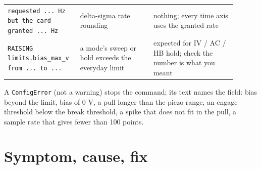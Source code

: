 \begin{longtable}{@{}>{\raggedright\arraybackslash}p{0.26\linewidth}>{\raggedright\arraybackslash}p{0.30\linewidth}>{\raggedright\arraybackslash}p{0.34\linewidth}@{}}
\texttt{requested .\discretionary{}{}{}.\discretionary{}{}{}.\discretionary{}{}{} Hz but the card granted .\discretionary{}{}{}.\discretionary{}{}{}.\discretionary{}{}{} Hz} & delta-sigma rate rounding & nothing; every time axis uses the granted rate \\
\texttt{RAISING limits.\discretionary{}{}{}bias\_\discretionary{}{}{}max\_\discretionary{}{}{}v from .\discretionary{}{}{}.\discretionary{}{}{}.\discretionary{}{}{} to .\discretionary{}{}{}.\discretionary{}{}{}.\discretionary{}{}{}} & a mode's sweep or hold exceeds the everyday limit & expected for IV / AC / HB hold; check the number is what you meant \\
\bottomrule
\end{longtable}
\normalsize

A \texttt{Config\discretionary{}{}{}Error} (not a warning) stops the command; its text names the field: bias beyond the limit, bias of 0 V, a pull longer than the piezo range, an engage threshold below the break threshold, a spike that does not fit in the pull, a sample rate that gives fewer than 100 points.

\section{Symptom, cause, fix}

